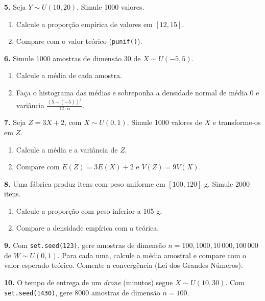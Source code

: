 \documentclass[
  portuguese,
  11pt,
  openany]{book}
\providecommand{\tightlist}{%
  \setlength{\itemsep}{0pt}\setlength{\parskip}{0pt}}
\begin{document}
\textbf{5.} Seja \(Y \sim U(10, 20)\). Simule 1000 valores.

\begin{enumerate}
\def\labelenumi{(\alph{enumi})}
\tightlist
\item
  Calcule a proporção empírica de valores em \([12, 15]\).
\item
  Compare com o valor teórico (\texttt{punif()}).
\end{enumerate}

\textbf{6.} Simule 1000 amostras de dimensão 30 de \(X \sim U(-5, 5)\).

\begin{enumerate}
\def\labelenumi{(\alph{enumi})}
\tightlist
\item
  Calcule a média de cada amostra.
\item
  Faça o histograma das médias e sobreponha a densidade normal de média 0 e variância
  \(\frac{(5-(-5))^2}{12 \cdot n}\).
\end{enumerate}

\textbf{7.} Seja \(Z = 3X + 2\), com \(X \sim U(0, 1)\). Simule 1000 valores de \(X\) e
transforme-os em \(Z\).

\begin{enumerate}
\def\labelenumi{(\alph{enumi})}
\tightlist
\item
  Calcule a média e a variância de \(Z\).
\item
  Compare com \(E(Z) = 3E(X) + 2\) e \(V(Z) = 9V(X)\).
\end{enumerate}

\textbf{8.} Uma fábrica produz itens com peso uniforme em \([100, 120]\) g. Simule 2000 itens.

\begin{enumerate}
\def\labelenumi{(\alph{enumi})}
\tightlist
\item
  Calcule a proporção com peso inferior a 105 g.
\item
  Compare a densidade empírica com a teórica.
\end{enumerate}

\textbf{9.} Com \texttt{set.seed(123)}, gere amostras de dimensão \(n = 100, 1000, 10\,000, 100\,000\)
de \(W \sim U(0, 1)\). Para cada uma, calcule a média amostral e compare com o valor
esperado teórico. Comente a convergência (Lei dos Grandes Números).

\textbf{10.} O tempo de entrega de um \emph{drone} (minutos) segue \(X \sim U(10, 30)\). Com
\texttt{set.seed(1430)}, gere 8000 amostras de dimensão \(n = 100\).
\end{document}

